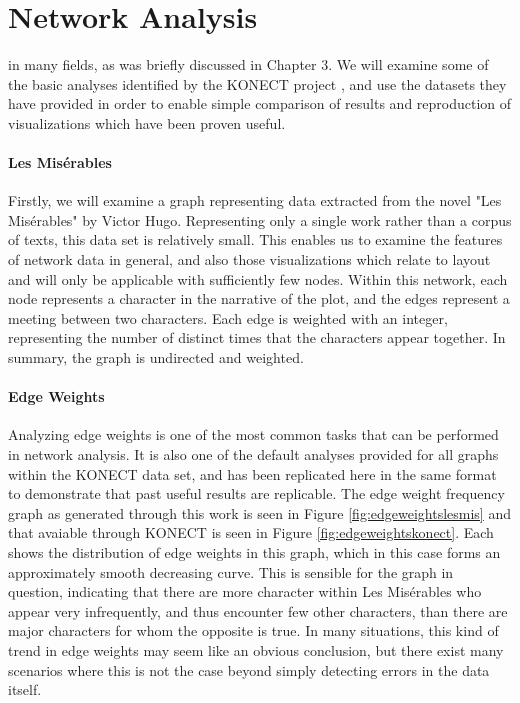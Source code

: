 \section{Network Analysis}
\label{sec:network}
 in many fields, as was briefly discussed in Chapter 3. We will examine some of the basic analyses identified by the KONECT project \cite{Kunegis2013}, and use the datasets they have provided in order to enable simple comparison of results and reproduction of visualizations which have been proven useful.

\paragraph{Les Misérables}
Firstly, we will examine a graph representing data extracted from the novel "Les Misérables" by Victor Hugo. Representing only a single work rather than a corpus of texts, this data set is relatively small. This enables us to examine the features of network data in general, and also those visualizations which relate to layout and will only be applicable with sufficiently few nodes. Within this network, each node represents a character in the narrative of the plot, and the edges represent a meeting between two characters. Each edge is weighted with an integer, representing the number of distinct times that the characters appear together. In summary, the graph is undirected and weighted.

\paragraph{Edge Weights}
Analyzing edge weights is one of the most common tasks that can be performed in network analysis. It is also one of the default analyses provided for all graphs within the KONECT data set, and has been replicated here in the same format to demonstrate that past useful results are replicable. The edge weight frequency graph as generated through this work is seen in Figure \ref{fig:edgeweightslesmis} and that avaiable through KONECT is seen in Figure \ref{fig:edgeweightskonect}. Each shows the distribution of edge weights in this graph, which in this case forms an approximately smooth decreasing curve. This is sensible for the graph in question, indicating that there are more character within Les Misérables who appear very infrequently, and thus encounter few other characters, than there are major characters for whom the opposite is true. In many situations, this kind of trend in edge weights may seem like an obvious conclusion, but there exist many scenarios where this is not the case beyond simply detecting errors in the data itself. 

